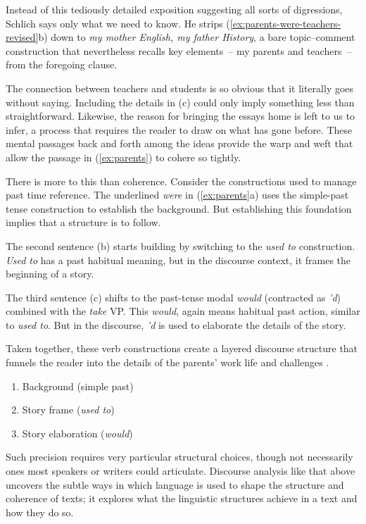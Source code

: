 Instead of this tediously detailed exposition suggesting all sorts of digressions, Schlich says only what we need to know. He strips (\ref{ex:parents-were-teachers-revised}b) down to \textit{my mother English, my father History}, a bare topic--comment construction that nevertheless recalls key elements~-- my parents and teachers~-- from the foregoing clause.

The connection between teachers and students is so obvious that it literally goes without saying. Including the details in (c) could only imply something less than straightforward. Likewise, the reason for bringing the essays home is left to us to infer, a process that requires the reader to draw on what has gone before. These mental passages back and forth among the ideas provide the warp and weft that allow the passage in (\ref{ex:parents}) to cohere so tightly.

\bigskip

There is more to this than coherence. Consider the constructions used to manage past time reference. The underlined \textit{were} in (\ref{ex:parents}a) uses the simple-past tense construction to establish the background. But establishing this foundation implies that a structure is to follow.

The second sentence (b) starts building by switching to the \textit{used to} construction. \textit{Used to} has a past habitual meaning, but in the discourse context, it frames the beginning of a story.

The third sentence (c) shifts to the past-tense modal \textit{would} (contracted as \textit{'d}) combined with the \textit{take} VP. This \textit{would}, again means habitual past action, similar to \textit{used to}. But in the discourse, \textit{'d} is used to elaborate the details of the story.

Taken together, these verb constructions create a layered discourse structure that funnels the reader into the details of the parents' work life and challenges \citep{Suh1992}.

\begin{enumerate}[noitemsep]
    \item Background (simple past)
    \item Story frame (\textit{used to})
    \item Story elaboration (\textit{would})
\end{enumerate}

Such precision requires very particular structural choices, though not necessarily ones most speakers or writers could articulate. Discourse analysis like that above uncovers the subtle ways in which language is used to shape the structure and coherence of texts; it explores what the linguistic structures achieve in a text and how they do so.

